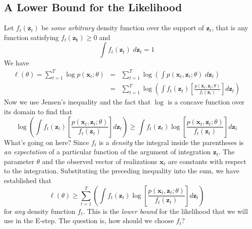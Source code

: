 \documentclass[12pt]{article}
\theoremstyle{definition}
\begin{document}
\subsection{A Lower Bound for the Likelihood}
Let $f_t(\mathbf{z}_t)$ be \emph{some arbitrary} density function over the support of $\mathbf{z}_t$, that is any function satisfying $f_t(\mathbf{z_t})\geq 0$ and
	$$\int f_t(\textbf{z}_t) \;d \textbf{z}_t = 1$$
We have
	\begin{eqnarray*}
		 \ell(\theta) = \sum_{t=1}^T \log p(\textbf{x}_t;\theta) &=& \sum_{t=1}^T \log \left(\int p(\textbf{x}_t,	\textbf{z}_t;\theta)\; d \textbf{z}_t \right)\\
		 	&=&  \sum_{t=1}^T \log \left(\int f_t(\mathbf{z}_t) \left[\frac{p(\textbf{x}_t,	\textbf{z}_t;\theta)}{f_t(\mathbf{z}_t)}\right] d \textbf{z}_t \right)
	\end{eqnarray*}
Now we use Jensen's inequality and the fact that $\log$ is a concave function over its domain to find that
	$$\log \left(\int f_t(\mathbf{z}_t) \left[\frac{p(\textbf{x}_t,	\textbf{z}_t;\theta)}{f_t(\mathbf{z}_t)}\right] d \textbf{z}_t \right) \geq \int f_t(\mathbf{z}_t) \log\left[\frac{p(\textbf{x}_t,\textbf{z}_t;\theta)}{f_t(\mathbf{z}_t)}\right] d \textbf{z}_t $$
What's going on here? Since $f_t$ is a \emph{density} the integral inside the parentheses is \emph{an expectation} of a particular function of the argument of integration $\mathbf{z}_t$. The parameter $\theta$ and the observed vector of realizations $\mathbf{x}_t$ are constants with respect to the integration. Substituting the preceding inequality into the sum, we have established that
	$$\ell(\theta) \geq \sum_{t=1}^T \left(\int f_t(\mathbf{z}_t) \log\left[\frac{p(\textbf{x}_t,\textbf{z}_t;\theta)}{f_t(\mathbf{z}_t)}\right] d \textbf{z}_t \right)$$
for \emph{any} density function $f_t$. This is the \emph{lower bound} for the likelihood that we will use in the E-step. The question is, how should we choose $f_t$? 
\end{document}
